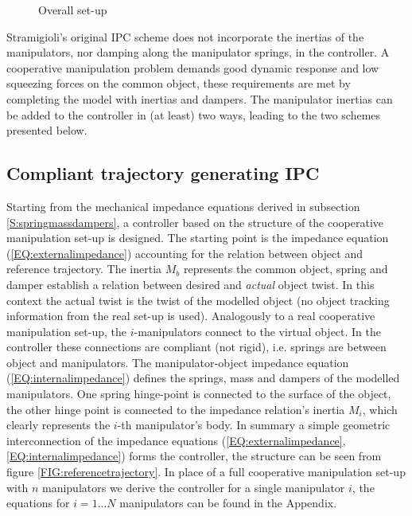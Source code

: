 \documentclass[a4paper,twoside, openright,12pt]{report}
\begin{document}
\begin{figure}[b]
	\centering
	\small
	\def\svgwidth{0.99\columnwidth}
	
	\caption{Overall set-up}
	\label{FIG:modelbasedcontrol}
\end{figure}
Stramigioli's original IPC scheme \cite{Stramigioli_01} does not incorporate the inertias of the manipulators, nor damping along the manipulator springs, in the controller. A cooperative manipulation problem demands good dynamic response and low squeezing forces on the common object, these requirements are met by completing the model with inertias and dampers. The manipulator inertias can be added to the controller in (at least) two ways, leading to the two schemes presented below.   

\subsection{Compliant trajectory generating IPC}\label{SS:referencetrajectoryDIPC}
Starting from the mechanical impedance equations derived in subsection \ref{S:springmassdampers}, a controller based on the structure of the cooperative manipulation set-up is designed. The starting point is the impedance equation (\ref{EQ:externalimpedance}) accounting for the relation between object and reference trajectory. The inertia $M_b$ represents the common object, spring and damper establish a relation between desired and \emph{actual} object twist. In this context the actual twist is the twist of the modelled object (no object tracking information from the real set-up is used). Analogously to a real cooperative manipulation set-up, the $i$-manipulators connect to the virtual object. In the controller these connections are compliant (not rigid), i.e. springs are between object and manipulators. The manipulator-object impedance equation (\ref{EQ:internalimpedance}) defines the springs, mass and dampers of the modelled manipulators. One spring hinge-point is connected to the surface of the object, the other hinge point is connected to the impedance relation's inertia  $M_i$, which clearly represents the $i$-th manipulator's body. In summary a simple geometric interconnection of the impedance equations (\ref{EQ:externalimpedance},\ref{EQ:internalimpedance}) forms the controller, the structure can be seen from figure \ref{FIG:referencetrajectory}. In place of a full cooperative manipulation set-up with $n$ manipulators we derive the controller for a single manipulator $i$, the equations for $i=1...N$ manipulators can be found in the Appendix.
\end{document}
